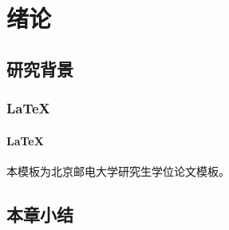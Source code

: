 \chapter{绪论}
\section{研究背景}
\subsection{\LaTeX}
\subsubsection{\LaTeX}

本模板为北京邮电大学研究生学位论文模板\cite{ddpg}。

\section{本章小结}


